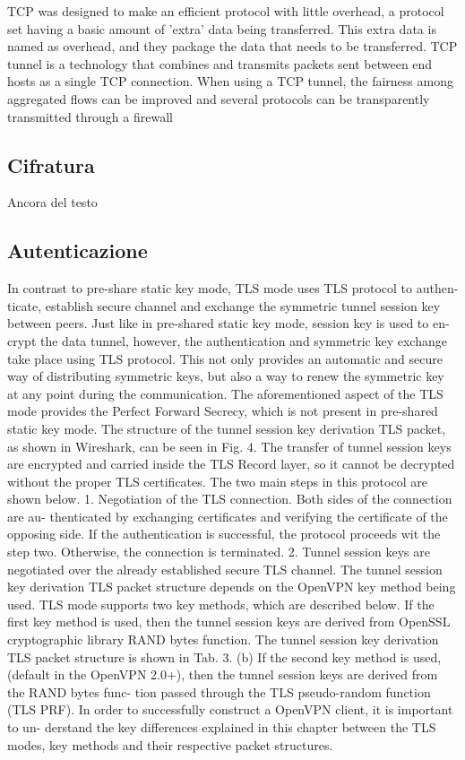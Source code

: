TCP was designed to make an efficient protocol with little overhead, a protocol set having a basic amount of ’extra’ data being transferred. This extra data is named as overhead,
and they package the data that needs to be transferred. TCP tunnel is a technology that combines and transmits packets sent between end hosts as a single TCP connection. When using a TCP tunnel, the fairness among aggregated flows can be improved and several protocols can be transparently transmitted through a firewall

\subsection{Cifratura}
Ancora del testo

\subsection{Autenticazione}
In contrast to pre-share static key mode, TLS mode uses TLS protocol to authen- ticate, establish secure channel and exchange the symmetric tunnel session key between peers.
Just like in pre-shared static key mode, session key is used to en- crypt the data tunnel, however, the authentication and symmetric key exchange take place using TLS protocol.
This not only provides an automatic and secure way of distributing symmetric keys, but also a way to renew the symmetric key at any point during the communication.
The aforementioned aspect of the TLS mode provides the Perfect Forward Secrecy, which is not present in pre-shared static key mode.
The structure of the tunnel session key derivation TLS packet, as shown in Wireshark, can be seen in Fig. 4.
The transfer of tunnel session keys are encrypted and carried inside the TLS Record layer, so it cannot be decrypted without the proper TLS certificates. The two main steps in this protocol are shown below.
1. Negotiation of the TLS connection. Both sides of the connection are au- thenticated by exchanging certificates and verifying the certificate of the opposing side. If the authentication is successful, the protocol proceeds wit the step two. Otherwise, the connection is terminated.
2. Tunnel session keys are negotiated over the already established secure TLS channel. The tunnel session key derivation TLS packet structure depends on the OpenVPN key method being used. TLS mode supports two key methods, which are described below.
If the first key method is used, then the tunnel session keys are derived from OpenSSL cryptographic library RAND bytes function.
The tunnel session key derivation TLS packet structure is shown in Tab. 3.
(b) If the second key method is used, (default in the OpenVPN 2.0+), then the tunnel session keys are derived from the RAND bytes func- tion passed through the TLS pseudo-random function (TLS PRF).
In order to successfully construct a OpenVPN client, it is important to un- derstand the key differences explained in this chapter between the TLS modes, key methods and their respective packet structures.


